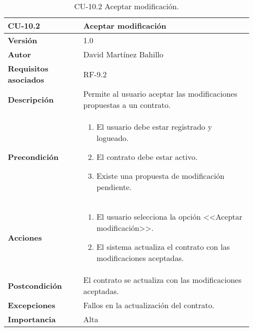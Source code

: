 \begin{table}[p]
	\centering
	\begin{tabularx}{\linewidth}{ p{} p{} }
		\toprule
		\textbf{CU-10.2}  & \textbf{Aceptar modificación}\\
		\midrule
		\textbf{Versión}              & 1.0    \\
		\textbf{Autor}                & David Martínez Bahillo \\
		\textbf{Requisitos asociados} & RF-9.2 \\
		\textbf{Descripción}          & Permite al usuario aceptar las modificaciones propuestas a un contrato. \\
		\textbf{Precondición}         &  
		\begin{enumerate}
			\item El usuario debe estar registrado y logueado.
			\item El contrato debe estar activo.
			\item Existe una propuesta de modificación pendiente.
		\end{enumerate}\\
		\textbf{Acciones}             &
		\begin{enumerate}
			\item El usuario selecciona la opción <<Aceptar modificación>>.
			\item El sistema actualiza el contrato con las modificaciones aceptadas.
		\end{enumerate}\\
		\textbf{Postcondición}        & El contrato se actualiza con las modificaciones aceptadas. \\
		\textbf{Excepciones}          & Fallos en la actualización del contrato. \\
		\textbf{Importancia}          & Alta \\
		\bottomrule
	\end{tabularx}
	\caption{CU-10.2 Aceptar modificación.}
\end{table}


